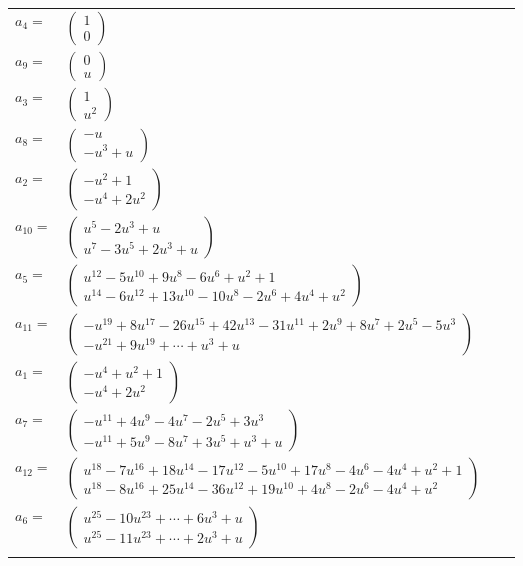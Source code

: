 \documentclass[1p]{elsarticle_modified}
\theoremstyle{definition}
\begin{document}
\begin{tabular}{m{7pt} m{180pt} m{7pt} m{180pt} }
\flushright $a_{4}=$&$\begin{pmatrix}1\\0\end{pmatrix}$ \\
\flushright $a_{9}=$&$\begin{pmatrix}0\\u\end{pmatrix}$ \\
\flushright $a_{3}=$&$\begin{pmatrix}1\\u^2\end{pmatrix}$ \\
\flushright $a_{8}=$&$\begin{pmatrix}- u\\- u^3+u\end{pmatrix}$ \\
\flushright $a_{2}=$&$\begin{pmatrix}- u^2+1\\- u^4+2 u^2\end{pmatrix}$ \\
\flushright $a_{10}=$&$\begin{pmatrix}u^5-2 u^3+u\\u^7-3 u^5+2 u^3+u\end{pmatrix}$ \\
\flushright $a_{5}=$&$\begin{pmatrix}u^{12}-5 u^{10}+9 u^8-6 u^6+u^2+1\\u^{14}-6 u^{12}+13 u^{10}-10 u^8-2 u^6+4 u^4+u^2\end{pmatrix}$ \\
\flushright $a_{11}=$&$\begin{pmatrix}- u^{19}+8 u^{17}-26 u^{15}+42 u^{13}-31 u^{11}+2 u^9+8 u^7+2 u^5-5 u^3\\- u^{21}+9 u^{19}+\cdots+u^3+u\end{pmatrix}$ \\
\flushright $a_{1}=$&$\begin{pmatrix}- u^4+u^2+1\\- u^4+2 u^2\end{pmatrix}$ \\
\flushright $a_{7}=$&$\begin{pmatrix}- u^{11}+4 u^9-4 u^7-2 u^5+3 u^3\\- u^{11}+5 u^9-8 u^7+3 u^5+u^3+u\end{pmatrix}$ \\
\flushright $a_{12}=$&$\begin{pmatrix}u^{18}-7 u^{16}+18 u^{14}-17 u^{12}-5 u^{10}+17 u^8-4 u^6-4 u^4+u^2+1\\u^{18}-8 u^{16}+25 u^{14}-36 u^{12}+19 u^{10}+4 u^8-2 u^6-4 u^4+u^2\end{pmatrix}$ \\
\flushright $a_{6}=$&$\begin{pmatrix}u^{25}-10 u^{23}+\cdots+6 u^3+u\\u^{25}-11 u^{23}+\cdots+2 u^3+u\end{pmatrix}$\\&\end{tabular}
\end{document}
